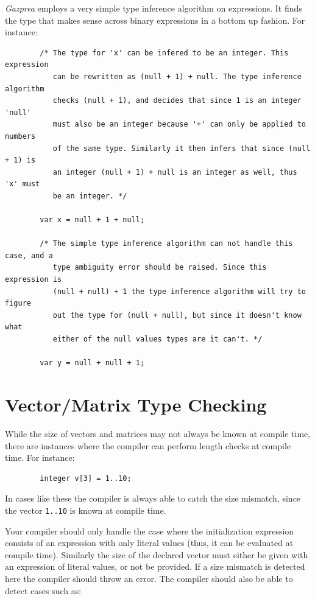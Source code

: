 \documentclass{article}
\begin{document}
	\textit{Gazprea} employs a very simple type inference algorithm on expressions.  It finds the type that makes sense
	across binary expressions in a bottom up fashion. For instance:

	\begin{lstlisting}
		/* The type for 'x' can be infered to be an integer. This expression
		   can be rewritten as (null + 1) + null. The type inference algorithm
		   checks (null + 1), and decides that since 1 is an integer 'null'
		   must also be an integer because '+' can only be applied to numbers
		   of the same type. Similarly it then infers that since (null + 1) is
		   an integer (null + 1) + null is an integer as well, thus 'x' must
		   be an integer. */

		var x = null + 1 + null;

		/* The simple type inference algorithm can not handle this case, and a
		   type ambiguity error should be raised. Since this expression is
		   (null + null) + 1 the type inference algorithm will try to figure
		   out the type for (null + null), but since it doesn't know what
		   either of the null values types are it can't. */

		var y = null + null + 1;
	\end{lstlisting}


\section{Vector/Matrix Type Checking}\label{sec:typeChecking}


	While the size of vectors and matrices may not always be known at compile time, there are instances where the
	compiler can perform length checks at compile time. For instance:

	\begin{lstlisting}
		integer v[3] = 1..10;
	\end{lstlisting}

	In cases like these the compiler is always able to catch the size mismatch, since the vector \texttt{1..10} is known
	at compile time.

	Your compiler should only handle the case where the initialization expression consists of an expression with only
	literal values (thus, it can be evaluated at compile time). Similarly the size of the declared vector must either be
	given with an expression of literal values, or not be provided. If a size mismatch is detected here the compiler
	should throw an error. The compiler should also be able to detect cases such as:
\end{document}
